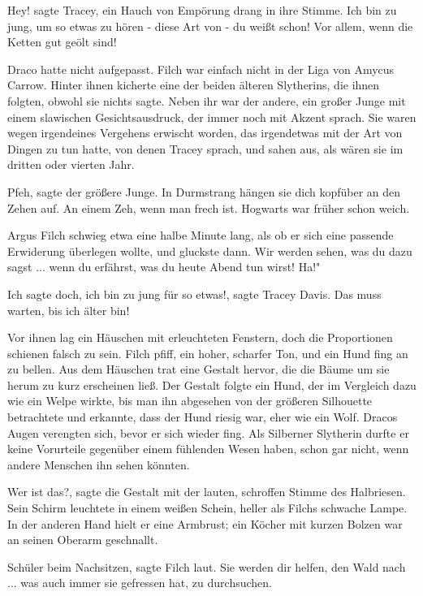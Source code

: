 \glqq{}Hey!\grqq{} sagte Tracey, ein Hauch von Empörung drang in ihre Stimme.
\glqq{}Ich bin zu jung, um so etwas zu hören - diese Art von - du weißt
schon! Vor allem, wenn die Ketten gut geölt sind!\grqq{}

Draco hatte nicht aufgepasst. Filch war einfach nicht in der Liga von Amycus
Carrow. Hinter ihnen kicherte eine der beiden älteren Slytherins, die
ihnen folgten, obwohl sie nichts sagte. Neben ihr war der andere, ein
großer Junge mit einem slawischen Gesichtsausdruck, der immer noch mit
Akzent sprach. Sie waren wegen irgendeines Vergehens erwischt worden, das
irgendetwas mit der Art von Dingen zu tun hatte, von denen Tracey sprach,
und sahen aus, als wären sie im dritten oder vierten Jahr.

\glqq{}Pfeh\grqq{}, sagte der größere Junge. \glqq{}In Durmstrang hängen sie dich
kopfüber an den Zehen auf. An einem Zeh, wenn man frech ist. Hogwarts war
früher schon weich.\grqq{}

Argus Filch schwieg etwa eine halbe Minute lang, als ob er sich eine passende
Erwiderung überlegen wollte, und gluckste dann. \glqq{}Wir werden sehen,
was du dazu sagst ... wenn du erfährst, was du heute Abend tun wirst!
Ha!"

\glqq{}Ich sagte doch, ich bin zu jung für so etwas!\grqq{}, sagte Tracey Davis.
\glqq{}Das muss warten, bis ich älter bin!\grqq{}

Vor ihnen lag ein Häuschen mit erleuchteten Fenstern, doch die Proportionen
schienen falsch zu sein. Filch pfiff, ein hoher, scharfer Ton, und ein
Hund fing an zu bellen. Aus dem Häuschen trat eine Gestalt hervor, die
die Bäume um sie herum zu kurz erscheinen ließ. Der Gestalt folgte ein
Hund, der im Vergleich dazu wie ein Welpe wirkte, bis man ihn abgesehen
von der größeren Silhouette betrachtete und erkannte, dass der Hund
riesig war, eher wie ein Wolf. Dracos Augen verengten sich, bevor er sich
wieder fing. Als Silberner Slytherin durfte er keine Vorurteile gegenüber
einem fühlenden Wesen haben, schon gar nicht, wenn andere Menschen ihn
sehen könnten.

\glqq{}Wer ist das?\grqq{}, sagte die Gestalt mit der lauten, schroffen Stimme
des Halbriesen. Sein Schirm leuchtete in einem weißen Schein, heller als
Filchs schwache Lampe. In der anderen Hand hielt er eine Armbrust; ein
Köcher mit kurzen Bolzen war an seinen Oberarm geschnallt.

\glqq{}Schüler beim Nachsitzen\grqq{}, sagte Filch laut. \glqq{}Sie werden dir
helfen, den Wald nach ... was auch immer sie gefressen hat, zu
durchsuchen.\grqq{}

